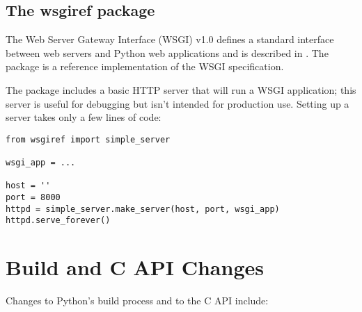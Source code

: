 \documentclass{howto}
\begin{document}
\subsection{The wsgiref package\label{module-wsgiref}}


The Web Server Gateway Interface (WSGI) v1.0 defines a standard
interface between web servers and Python web applications and is
described in .  The  package is a reference
implementation of the WSGI specification.

The package includes a basic HTTP server that will run a WSGI
application; this server is useful for debugging but isn't intended for 
production use.  Setting up a server takes only a few lines of code:

\begin{verbatim}
from wsgiref import simple_server

wsgi_app = ...

host = ''
port = 8000
httpd = simple_server.make_server(host, port, wsgi_app)
httpd.serve_forever()
\end{verbatim}


\begin{seealso}



\end{seealso}


\section{Build and C API Changes\label{build-api}}

Changes to Python's build process and to the C API include:
\end{document}
